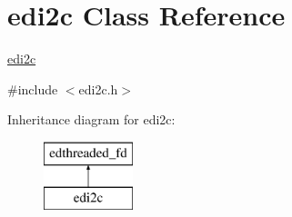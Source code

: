 \hypertarget{classedi2c}{\section{edi2c Class Reference}
\label{classedi2c}
}


\hyperlink{classedi2c}{edi2c}  




{\ttfamily \#include $<$edi2c.\-h$>$}

Inheritance diagram for edi2c\-:\begin{figure}[H]
\begin{center}
\leavevmode
\includegraphics[height=2.000000cm]{classedi2c}
\end{center}
\end{figure}

